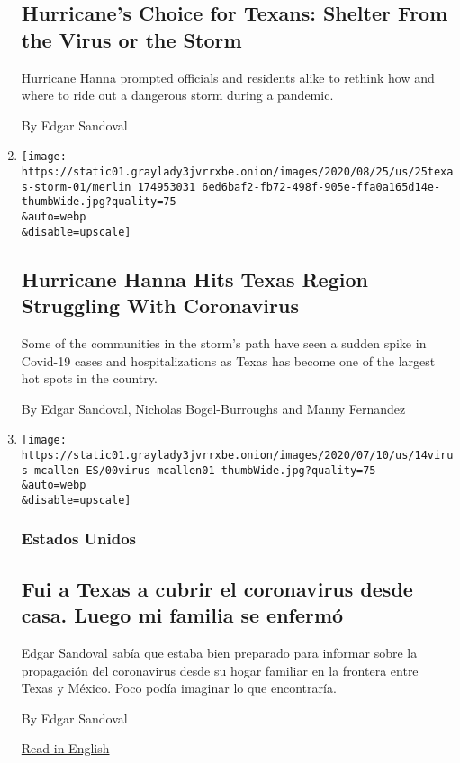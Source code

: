 \begin{enumerate}
{  \subsection{Hurricane's Choice for Texans: Shelter From the Virus or
  the
  Storm}\label{hurricanes-choice-for-texans-shelter-from-the-virus-or-the-storm}}

  Hurricane Hanna prompted officials and residents alike to rethink how
  and where to ride out a dangerous storm during a pandemic.

  By Edgar Sandoval
\item
  \href{/2020/07/25/us/hanna-storm-texas.html}{}

  \texttt{[image: https://static01.graylady3jvrrxbe.onion/images/2020/08/25/us/25texas-storm-01/merlin\_174953031\_6ed6baf2-fb72-498f-905e-ffa0a165d14e-thumbWide.jpg?quality=75\\\&auto=webp\\\&disable=upscale]}

  \hypertarget{hurricane-hanna-hits-texas-region-struggling-with-coronavirus}{%
  \subsection{Hurricane Hanna Hits Texas Region Struggling With
  Coronavirus}\label{hurricane-hanna-hits-texas-region-struggling-with-coronavirus}}

  Some of the communities in the storm's path have seen a sudden spike
  in Covid-19 cases and hospitalizations as Texas has become one of the
  largest hot spots in the country.

  By Edgar Sandoval, Nicholas Bogel-Burroughs and Manny Fernandez
\item
  \href{/es/2020/07/14/espanol/texas-coronavirus-rio-grande-valley.html}{}

  \texttt{[image: https://static01.graylady3jvrrxbe.onion/images/2020/07/10/us/14virus-mcallen-ES/00virus-mcallen01-thumbWide.jpg?quality=75\\\&auto=webp\\\&disable=upscale]}

  \hypertarget{estados-unidos}{%
  \subsubsection{Estados Unidos}\label{estados-unidos}}

  \hypertarget{fui-a-texas-a-cubrir-el-coronavirus-desde-casa-luego-mi-familia-se-enfermuxf3}{%
  \subsection{Fui a Texas a cubrir el coronavirus desde casa. Luego mi
  familia se
  enfermó}\label{fui-a-texas-a-cubrir-el-coronavirus-desde-casa-luego-mi-familia-se-enfermuxf3}}

  Edgar Sandoval sabía que estaba bien preparado para informar sobre la
  propagación del coronavirus desde su hogar familiar en la frontera
  entre Texas y México. Poco podía imaginar lo que encontraría.

  By Edgar Sandoval

  \href{https://www.nytimes3xbfgragh.onion/2020/07/14/us/coronavirus-texas-rio-grande-valley-border.html}{Read
  in English}
\end{enumerate}

